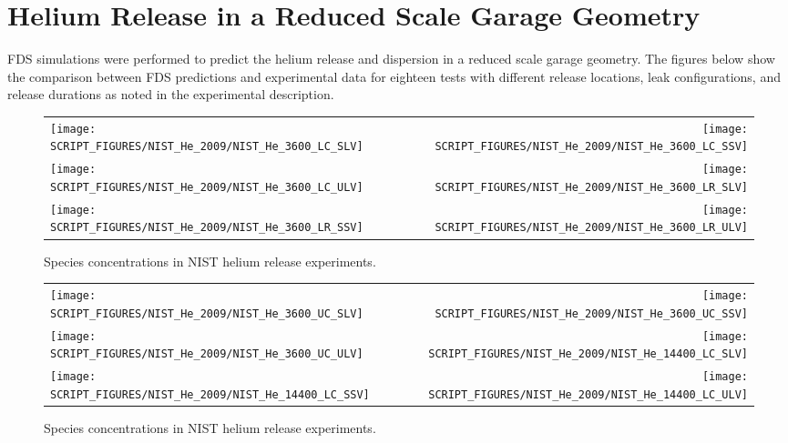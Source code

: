 \clearpage

\section{Helium Release in a Reduced Scale Garage Geometry}

FDS simulations were performed to predict the helium release and dispersion in a reduced scale garage geometry.
The figures below show the comparison between FDS predictions and experimental data for eighteen tests with different release locations,
leak configurations, and release durations as noted in the experimental description.  

\begin{figure}[h!]
\begin{tabular*}{\textwidth}{l@{\extracolsep{\fill}}r}
\texttt{[image: SCRIPT\_FIGURES/NIST\_He\_2009/NIST\_He\_3600\_LC\_SLV]} &
\texttt{[image: SCRIPT\_FIGURES/NIST\_He\_2009/NIST\_He\_3600\_LC\_SSV]} \\
\texttt{[image: SCRIPT\_FIGURES/NIST\_He\_2009/NIST\_He\_3600\_LC\_ULV]} &
\texttt{[image: SCRIPT\_FIGURES/NIST\_He\_2009/NIST\_He\_3600\_LR\_SLV]} \\
\texttt{[image: SCRIPT\_FIGURES/NIST\_He\_2009/NIST\_He\_3600\_LR\_SSV]} &
\texttt{[image: SCRIPT\_FIGURES/NIST\_He\_2009/NIST\_He\_3600\_LR\_ULV]}
\end{tabular*}
\caption[Species concentrations in NIST helium release experiments]{Species concentrations in NIST helium release experiments.}
\label{NIST_Hydrogen_Species_1}
\end{figure}

\begin{figure}[h!]
\begin{tabular*}{\textwidth}{l@{\extracolsep{\fill}}r}
\texttt{[image: SCRIPT\_FIGURES/NIST\_He\_2009/NIST\_He\_3600\_UC\_SLV]} &
\texttt{[image: SCRIPT\_FIGURES/NIST\_He\_2009/NIST\_He\_3600\_UC\_SSV]} \\
\texttt{[image: SCRIPT\_FIGURES/NIST\_He\_2009/NIST\_He\_3600\_UC\_ULV]} &
\texttt{[image: SCRIPT\_FIGURES/NIST\_He\_2009/NIST\_He\_14400\_LC\_SLV]} \\
\texttt{[image: SCRIPT\_FIGURES/NIST\_He\_2009/NIST\_He\_14400\_LC\_SSV]} &
\texttt{[image: SCRIPT\_FIGURES/NIST\_He\_2009/NIST\_He\_14400\_LC\_ULV]}
\end{tabular*}
\caption[Species concentrations in NIST helium release experiments]{Species concentrations in NIST helium release experiments.}
\label{NIST_Hydrogen_Species_2}
\end{figure}

